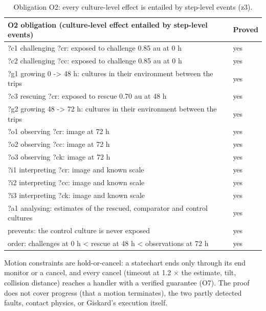 \documentclass[10pt,a4paper]{article}
\begin{document}
\begin{table}[tbp]\centering\small
\caption{Obligation O2: every culture-level effect is entailed by step-level events (z3).}\label{tab:o2}
\begin{tabularx}{\linewidth}{Xl}\toprule
\textbf{O2 obligation (culture-level effect entailed by step-level events)} & \textbf{Proved} \\\midrule
?c1 challenging ?cr: exposed to challenge 0.85 au at 0 h & yes \\
?c2 challenging ?cc: exposed to challenge 0.85 au at 0 h & yes \\
?g1 growing 0 -> 48 h: cultures in their environment between the trips & yes \\
?c3 rescuing ?cr: exposed to rescue 0.70 au at 48 h & yes \\
?g2 growing 48 -> 72 h: cultures in their environment between the trips & yes \\
?o1 observing ?cr: image at 72 h & yes \\
?o2 observing ?cc: image at 72 h & yes \\
?o3 observing ?ck: image at 72 h & yes \\
?i1 interpreting ?cr: image and known scale & yes \\
?i2 interpreting ?cc: image and known scale & yes \\
?i3 interpreting ?ck: image and known scale & yes \\
?a1 analysing: estimates of the rescued, comparator and control cultures & yes \\
prevents: the control culture is never exposed & yes \\
order: challenges at 0 h < rescue at 48 h < observations at 72 h & yes \\\bottomrule
\end{tabularx}
\end{table}

Motion constraints are hold-or-cancel: a statechart ends only through its end monitor or a cancel, and every cancel (timeout at 1.2 × the estimate, tilt, collision distance) reaches a handler with a verified guarantee (O7). The proof does not cover progress (that a motion terminates), the two partly detected faults, contact physics, or Giskard's execution itself.
\end{document}
